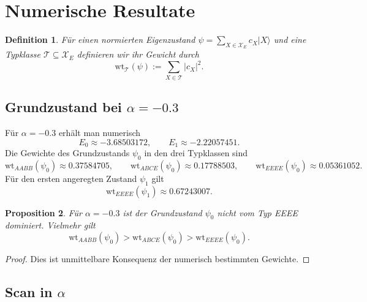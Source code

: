 \documentclass[11pt,a4paper]{article}
\newtheorem{definition}{Definition}[section]
\newtheorem{proposition}[definition]{Proposition}
\theoremstyle{remark}
\newcommand{\XE}{\mathcal X_E}
\newcommand{\wt}{\mathrm{wt}}
\begin{document}
	\section{Numerische Resultate}
	
	\begin{definition}
		Für einen normierten Eigenzustand \(\psi=\sum_{X\in \XE} c_X |X\rangle\) und eine Typklasse \(\mathcal T\subseteq \XE\) definieren wir ihr Gewicht durch
		\[
		\wt_{\mathcal T}(\psi):=\sum_{X\in\mathcal T}|c_X|^2.
		\]
	\end{definition}
	
	\subsection{Grundzustand bei \texorpdfstring{$\alpha=-0.3$}{alpha=-0.3}}
	
	Für \(\alpha=-0.3\) erhält man numerisch
	\[
	E_0\approx -3.68503172,\qquad E_1\approx -2.22057451.
	\]
	Die Gewichte des Grundzustands \(\psi_0\) in den drei Typklassen sind
	\[
	\wt_{AABB}(\psi_0)\approx 0.37584705,\qquad
	\wt_{ABCE}(\psi_0)\approx 0.17788503,\qquad
	\wt_{EEEE}(\psi_0)\approx 0.05361052.
	\]
	Für den ersten angeregten Zustand \(\psi_1\) gilt
	\[
	\wt_{EEEE}(\psi_1)\approx 0.67243007.
	\]
	
	\begin{proposition}
		Für \(\alpha=-0.3\) ist der Grundzustand \(\psi_0\) nicht vom Typ EEEE dominiert. Vielmehr gilt
		\[
		\wt_{AABB}(\psi_0)>\wt_{ABCE}(\psi_0)>\wt_{EEEE}(\psi_0).
		\]
	\end{proposition}
	
	\begin{proof}
		Dies ist unmittelbare Konsequenz der numerisch bestimmten Gewichte.
	\end{proof}
	
	\subsection{Scan in \texorpdfstring{$\alpha$}{alpha}}
	
\end{document}
